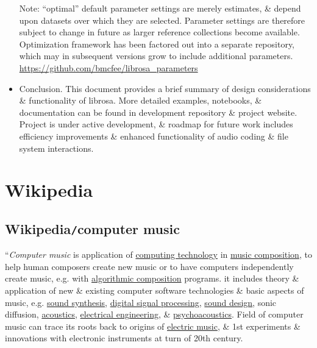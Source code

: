 \documentclass{article}
\begin{document}
\begin{itemize}
	Note: ``optimal'' default parameter settings are merely estimates, \& depend upon datasets over which they are selected. Parameter settings are therefore subject to change in future as larger reference collections become available. Optimization framework has been factored out into a separate repository, which may in subsequent versions grow to include additional parameters. \url{https://github.com/bmcfee/librosa_parameters}
	\item {\sf Conclusion.} This document provides a brief summary of design considerations \& functionality of librosa. More detailed examples, notebooks, \& documentation can be found in development repository \& project website. Project is under active development, \& roadmap for future work includes efficiency improvements \& enhanced functionality of audio coding \& file system interactions.
\end{itemize}


\section{Wikipedia}

\subsection{Wikipedia{\tt/}computer music}
``{\it Computer music} is application of \href{https://en.wikipedia.org/wiki/Computing_technology}{computing technology} in \href{https://en.wikipedia.org/wiki/Musical_composition}{music composition}, to help human composers create new music or to have computers independently create music, e.g. with \href{https://en.wikipedia.org/wiki/Algorithmic_composition}{algorithmic composition} programs. it includes theory \& application of new \& existing computer software technologies \& basic aspects of music, e.g. \href{https://en.wikipedia.org/wiki/Sound_synthesis}{sound synthesis}, \href{https://en.wikipedia.org/wiki/Digital_signal_processing}{digital signal processing}, \href{https://en.wikipedia.org/wiki/Sound_design}{sound design}, sonic diffusion, \href{https://en.wikipedia.org/wiki/Acoustics}{acoustics}, \href{https://en.wikipedia.org/wiki/Electrical_engineering}{electrical engineering}, \& \href{https://en.wikipedia.org/wiki/Psychoacoustics}{psychoacoustics}. Field of computer music can trace its roots back to origins of \href{https://en.wikipedia.org/wiki/Electronic_music}{electric music}, \& 1st experiments \& innovations with electronic instruments at turn of 20th century.
\end{document}

